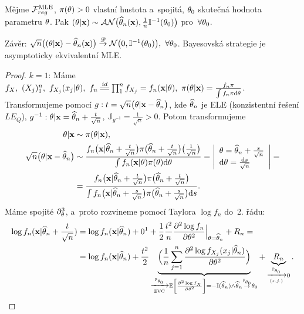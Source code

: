 \begin{dusl}
	Mějme $\mathcal{F}_{reg}^{\mathrm{{\footnotesize MLE }}}$, $\pi(\theta)>0$ vlastní hustota a~spojitá, $\theta_0$ skutečná hodnota parametru $\theta$. Pak $(\theta|\textbf{x})\sim\mathcal{AN}\big(\widehat{\theta}_n(\textbf{x}),\frac{1}{n}\mathbb{I}^{-1}(\theta_0)\big)$ pro~$\forall\theta_0$.
	
	Závěr: $\sqrt{n}\big( (\theta|\textbf{x})-\widehat{\theta}_n(\textbf{x}) \big)\stackrel{\mathscr{D}}{\to} \mathcal{N}\big( 0,\mathbb{I}^{-1}(\theta_0) \big),~\forall\theta_0$. Bayesovská strategie je asymptoticky ekvivalentní MLE.
	\begin{proof}
		$k=1$: Máme $f_{X},~(X_j)_1^n,~f_{X_j}(x_j|\t),~f_n\equal{id}\prod_1^n f_{X_j}=f_n(\textbf{x}|\t),~\pi(\t|\textbf{x})=\frac{f_n \pi}{\int f_n \pi\d\t}$. Transformujeme pomocí $g: t=\sqrt{n}\big( \theta|\textbf{x}-\widehat{\theta}_n \big)$, kde $\widehat{\theta}_n$ je ELE (konzistentní řešení $LE_Q$), $g^{-1}:\theta|\textbf{x}=\widehat{\theta}_n + \frac{t}{\sqrt{n}}$, $\mathbb{J}_{g^{-1}}=\frac{1}{\sqrt{n}}>0$. Potom transformujeme
		\[
		\begin{split}
		\theta|\textbf{x}&\sim\pi(\theta|\textbf{x}),\\
		\sqrt{n}\big(\theta|\textbf{x}-\widehat{\theta}_n\big)&\sim\frac{f_n\big(\textbf{x}|\widehat{\theta}_n+\frac{t}{\sqrt{n}}\big)\pi\big( \widehat{\theta}_n+\frac{t}{\sqrt{n}} \big)\big(\frac{1}{\sqrt{n}}\big)}{\int f_n(\textbf{x}|\theta)\pi(\theta)\mathrm{d}\theta}=\left|\begin{array}{l}
		\theta=\widehat{\theta}_n+\frac{s}{\sqrt{n}}\\\mathrm{d}\theta=\frac{\mathrm{d} s}{\sqrt{n}}\end{array}
		\right|=\\ &=\frac{f_n\big(\textbf{x}|\widehat{\theta}_n+\frac{t}{\sqrt{n}}\big)\pi\big( \widehat{\theta}_n+\frac{t}{\sqrt{n}} \big)}{\int f_n\big(\textbf{x}|\widehat{\theta}_n+\frac{s}{\sqrt{n}}\big)\pi\big( \widehat{\theta}_n+\frac{s}{\sqrt{n}} \big)\mathrm{d} s}.
		\end{split}
		\]
		Máme spojité $\partial_\theta^3$, a~proto rozvineme pomocí Taylora $\log f_n$ do~2. řádu:
		\[
		\begin{split}
		\log f_n(\textbf{x}|\htn+\frac{t}{\sqrt{n}})&=\log f_n(\textbf{x}|\htn)+0\text{\footnotemark}+\frac{1}{2}\frac{t^2}{n}\frac{\partial^2 \log f_n}{\partial\t^2}\Big|_{\t=\htn}+R_n=\\&=\log f_n(\textbf{x}|\htn)+\frac{t^2}{2}\underbrace{\Big( \frac{1}{n}\sumjn \frac{\partial^2 \log f_{X_j}(x_j|\htn)}{\partial\t^2} \Big)}_{\xrightarrow[\text{ZVČ}]{\PP_{\t_0}}\EE{\frac{\partial^2\log f_X}{\partial\t^2}}=-\mathbb{I}(\htn)\wedge \htn \stackrel{\PP_{\t_0}}{\rightarrow} \t_0}+\underbrace{R_n}_{\xrightarrow[(s.j.)]{\PP_{\t_0}}0}.
		\end{split}
		\]

\end{proof}
\end{dusl}
